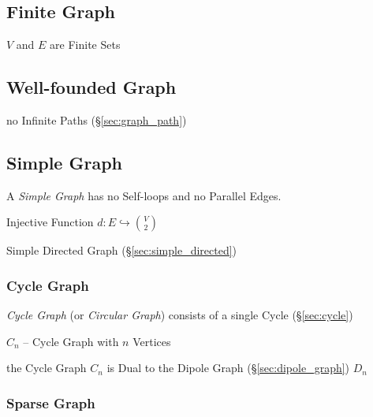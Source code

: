 \subsection{Finite Graph}\label{sec:finite_graph}

$V$ and $E$ are Finite Sets



\subsection{Well-founded Graph}\label{sec:wellfounded_graph}

no Infinite Paths (\S\ref{sec:graph_path})



\subsection{Simple Graph}\label{sec:simple_graph}

A \emph{Simple Graph} has no Self-loops and no Parallel Edges.

Injective Function $d : E \hookrightarrow {V \choose 2}$

Simple Directed Graph (\S\ref{sec:simple_directed})



\subsubsection{Cycle Graph}\label{sec:cycle_graph}

\emph{Cycle Graph} (or \emph{Circular Graph}) consists of a single
Cycle (\S\ref{sec:cycle})

$C_n$ -- Cycle Graph with $n$ Vertices

the Cycle Graph $C_n$ is Dual to the Dipole Graph
(\S\ref{sec:dipole_graph}) $D_n$



\subsubsection{Sparse Graph}\label{sec:sparse_graph}

